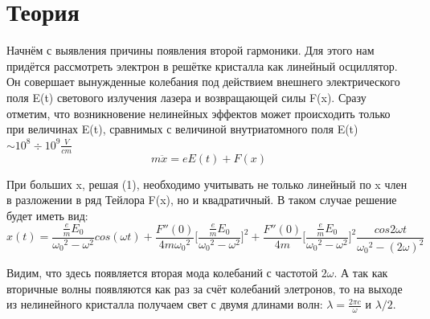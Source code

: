 \documentclass[a4paper,10pt]{article} %
\begin{document}


\newpage

\section{Теория}
Начнём с выявления причины появления второй гармоники. Для этого нам придётся рассмотреть электрон в решётке кристалла как линейный осциллятор. Он совершает вынужденные колебания под действием внешнего электрического поля E(t) светового излучения лазера и возвращающей силы F(x). Сразу отметим, что возникновение нелинейных эффектов может происходить только при величинах E(t), сравнимых с величиной внутриатомного поля E(t) $\sim 10^8 \div 10^9 \frac{V}{cm}$
\begin{equation}
m \ddot{x} = e E(t) + F(x)
\end{equation}

При больших x, решая (1), необходимо учитывать не только линейный по x член в разложении в  ряд Тейлора F(x), но и квадратичный. В таком случае решение будет иметь вид:
\begin{equation}
x(t) = \frac{\frac{e}{m} E_0}{{\omega_0}^2 - {\omega}^2} cos(\omega t) 
+ \frac{F''(0)}{4m {\omega_0}^2} \Big[\frac{\frac{e}{m} E_0}{{\omega_0}^2 - {\omega}^2}\Big]^2
+ \frac{F''(0)}{4m} \Big[\frac{\frac{e}{m} E_0}{{\omega_0}^2 - {\omega}^2}\Big]^2
\frac{cos2\omega t}{{\omega_0}^2 - (2 \omega)^2}
\end{equation}

Видим, что здесь появляется вторая мода колебаний с частотой $2 \omega$. А так как вторичные волны появляются как раз за счёт колебаний элетронов, то на выходе из нелинейного кристалла получаем свет с двумя длинами волн: $\lambda = \frac{2 \pi c}{\omega}$ и $\lambda / 2$.\\
\end{document}
